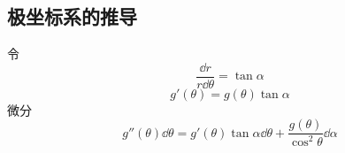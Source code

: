 \subsection{极坐标系的推导}
令
\begin{equation}
\frac{\dd{r}}{r \dd{\theta}} = \tan\alpha
\end{equation}
\begin{equation}
g'(\theta) = g(\theta)\tan\alpha
\end{equation}
微分
\begin{equation}
g''(\theta)\dd{\theta} = g'(\theta)\tan\alpha\dd{\theta} + \frac{g(\theta)}{\cos^2\theta}\dd{\alpha}
\end{equation}
